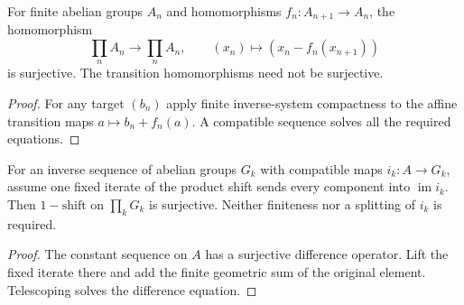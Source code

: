 \begin{proposition}
  \label{prop:finite-inverse-sequence-sub-shift}
  \leanok
  For finite abelian groups $A_n$ and homomorphisms
  $f_n:A_{n+1}\to A_n$, the homomorphism
  \[
    \prod_n A_n\longrightarrow\prod_n A_n,\qquad
    (x_n)\longmapsto(x_n-f_n(x_{n+1}))
  \]
  is surjective. The transition homomorphisms need not be surjective.
\end{proposition}
\begin{proof}
  For any target $(b_n)$ apply finite inverse-system compactness to the
  affine transition maps $a\mapsto b_n+f_n(a)$. A compatible sequence
  solves all the required equations.
  \leanok
\end{proof}

\begin{proposition}
  \label{prop:uniform-image-derived-limit}
  \leanok
  For an inverse sequence of abelian groups $G_k$ with compatible maps
  $i_k:A\to G_k$, assume one fixed iterate of the product shift sends
  every component into $\operatorname{im}i_k$. Then $1-\mathrm{shift}$
  on $\prod_kG_k$ is surjective. Neither finiteness nor a splitting of
  $i_k$ is required.
\end{proposition}
\begin{proof}
  The constant sequence on $A$ has a surjective difference operator.
  Lift the fixed iterate there and add the finite geometric sum of the
  original element. Telescoping solves the difference equation.
  \leanok
\end{proof}

